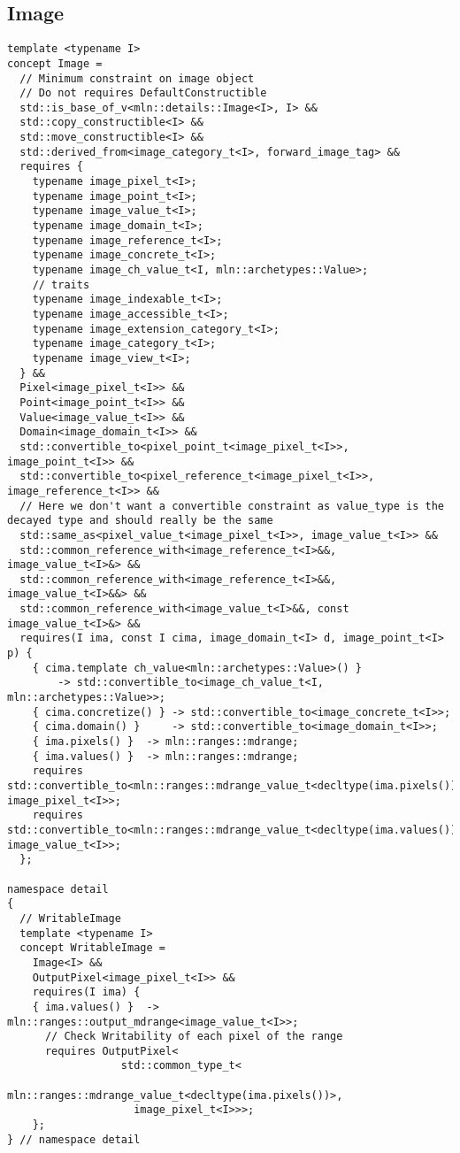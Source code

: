 \subsection{Image}

\begin{verbatim}
template <typename I>
concept Image =
  // Minimum constraint on image object
  // Do not requires DefaultConstructible
  std::is_base_of_v<mln::details::Image<I>, I> &&
  std::copy_constructible<I> &&
  std::move_constructible<I> &&
  std::derived_from<image_category_t<I>, forward_image_tag> &&
  requires {
    typename image_pixel_t<I>;
    typename image_point_t<I>;
    typename image_value_t<I>;
    typename image_domain_t<I>;
    typename image_reference_t<I>;
    typename image_concrete_t<I>;
    typename image_ch_value_t<I, mln::archetypes::Value>;
    // traits
    typename image_indexable_t<I>;
    typename image_accessible_t<I>;
    typename image_extension_category_t<I>;
    typename image_category_t<I>;
    typename image_view_t<I>;
  } &&
  Pixel<image_pixel_t<I>> &&
  Point<image_point_t<I>> &&
  Value<image_value_t<I>> &&
  Domain<image_domain_t<I>> &&
  std::convertible_to<pixel_point_t<image_pixel_t<I>>, image_point_t<I>> &&
  std::convertible_to<pixel_reference_t<image_pixel_t<I>>, image_reference_t<I>> &&
  // Here we don't want a convertible constraint as value_type is the decayed type and should really be the same
  std::same_as<pixel_value_t<image_pixel_t<I>>, image_value_t<I>> &&
  std::common_reference_with<image_reference_t<I>&&, image_value_t<I>&> &&
  std::common_reference_with<image_reference_t<I>&&, image_value_t<I>&&> &&
  std::common_reference_with<image_value_t<I>&&, const image_value_t<I>&> &&
  requires(I ima, const I cima, image_domain_t<I> d, image_point_t<I> p) {
    { cima.template ch_value<mln::archetypes::Value>() }
        -> std::convertible_to<image_ch_value_t<I, mln::archetypes::Value>>;
    { cima.concretize() } -> std::convertible_to<image_concrete_t<I>>;
    { cima.domain() }     -> std::convertible_to<image_domain_t<I>>;
    { ima.pixels() }  -> mln::ranges::mdrange;
    { ima.values() }  -> mln::ranges::mdrange;
    requires std::convertible_to<mln::ranges::mdrange_value_t<decltype(ima.pixels())>, image_pixel_t<I>>;
    requires std::convertible_to<mln::ranges::mdrange_value_t<decltype(ima.values())>, image_value_t<I>>;
  };

namespace detail
{
  // WritableImage
  template <typename I>
  concept WritableImage =
    Image<I> &&
    OutputPixel<image_pixel_t<I>> &&
    requires(I ima) {
    { ima.values() }  -> mln::ranges::output_mdrange<image_value_t<I>>;
      // Check Writability of each pixel of the range
      requires OutputPixel<
                  std::common_type_t<
                    mln::ranges::mdrange_value_t<decltype(ima.pixels())>,
                    image_pixel_t<I>>>;
    };
} // namespace detail



\end{verbatim}
